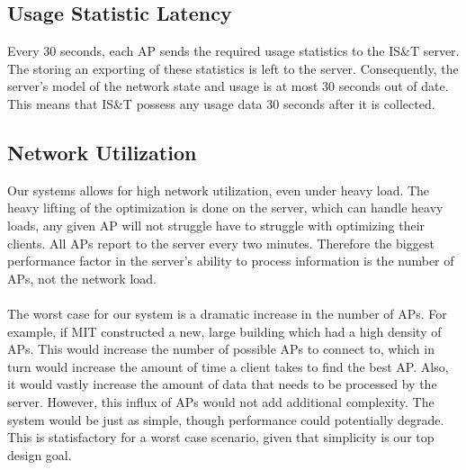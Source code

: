 \documentclass[10pt,journal,compsoc]{IEEEtran}
\begin{document}
		\subsection{Usage Statistic Latency}
		Every 30 seconds, each AP sends the required usage statistics to the IS\&T server. The storing an exporting of these statistics is left to the server. Consequently, the server's model of the network state and usage is at most 30 seconds out of date. This means that IS\&T possess any usage data 30 seconds after it is collected.
		
		\subsection{Network Utilization}
		Our systems allows for high network utilization, even under heavy load. The heavy lifting of the optimization is done on the server, which can handle heavy loads, any given AP will not struggle have to struggle with optimizing their clients. All APs report to the server every two minutes. Therefore the biggest performance factor in the server's ability to process information is the number of APs, not the network load.\\
		\\
		The worst case for our system is a dramatic increase in the number of APs. For example, if MIT constructed a new, large building which had a high density of APs. This would increase the number of possible APs to connect to, which in turn would increase the amount of time a client takes to find the best AP. Also, it would vastly increase the amount of data that needs to be processed by the server. However, this influx of APs would not add additional complexity. The system would be just as simple, though performance could potentially degrade. This is statisfactory for a worst case scenario, given that simplicity is our top design goal.
		
\end{document}
